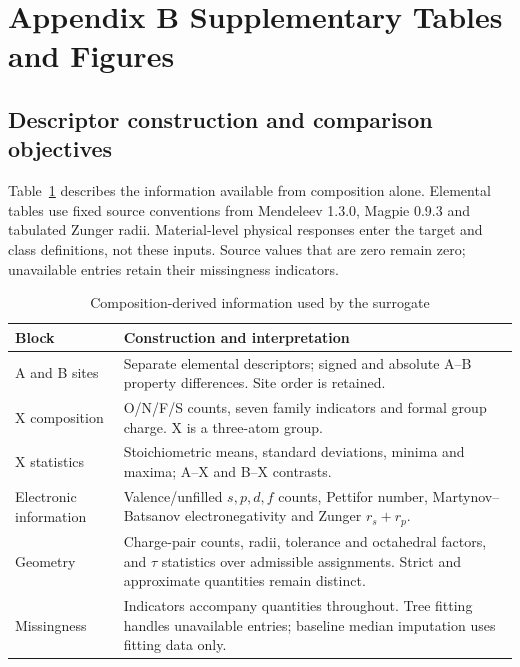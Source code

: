 \section*{Appendix B Supplementary Tables and Figures}
\setcounter{subsection}{0}
\renewcommand{\thesubsection}{B.\arabic{subsection}}
\setcounter{figure}{0}
\renewcommand{\thefigure}{B.\arabic{figure}}
\setcounter{table}{0}
\renewcommand{\thetable}{B.\arabic{table}}

\subsection{Descriptor construction and comparison objectives}\label{app:descriptors}
Table~\ref{tab:descriptors} describes the information available from composition alone. Elemental tables use fixed source conventions from Mendeleev 1.3.0, Magpie 0.9.3 and tabulated Zunger radii. Material-level physical responses enter the target and class definitions, not these inputs. Source values that are zero remain zero; unavailable entries retain their missingness indicators.
\par
\begin{table}[H]
\centering
\caption{Composition-derived information used by the surrogate}\label{tab:descriptors}
\begin{tabularx}{\linewidth}{@{}l X@{}}
\toprule
Block & Construction and interpretation\\
\midrule
A and B sites & Separate elemental descriptors; signed and absolute A--B property differences. Site order is retained.\\
X composition & O/N/F/S counts, seven family indicators and formal group charge. X is a three-atom group.\\
X statistics & Stoichiometric means, standard deviations, minima and maxima; A--X and B--X contrasts.\\
Electronic information & Valence/unfilled $s,p,d,f$ counts, Pettifor number, Martynov--Batsanov electronegativity and Zunger $r_s+r_p$.\\
Geometry & Charge-pair counts, radii, tolerance and octahedral factors, and $\tau$ statistics over admissible assignments. Strict and approximate quantities remain distinct.\\
Missingness & Indicators accompany quantities throughout. Tree fitting handles unavailable entries; baseline median imputation uses fitting data only.\\
\bottomrule
\end{tabularx}
\end{table}
\par

